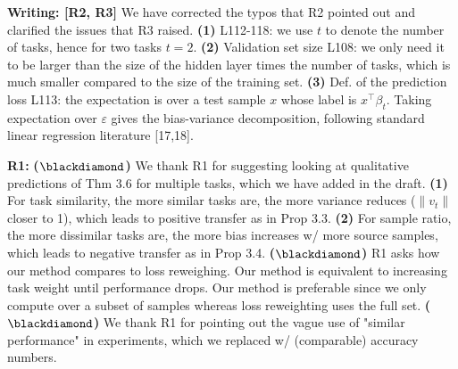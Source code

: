 \documentclass{article}
\begin{document}
\vspace{-0.025in}
\textbf{Writing: [R2, R3]}
We have corrected the typos that R2 pointed out and clarified the issues that R3 raised.
\textbf{(1)} L112-118: we use $t$ to denote the number of tasks, hence for two tasks $t = 2$.
\textbf{(2)} Validation set size L108: we only need it to be larger than the size of the hidden layer times the number of tasks, which is much smaller compared to the size of the training set.
\textbf{(3)} Def. of the prediction loss L113: the expectation is over a test sample $x$ whose label is $x^{\top}\beta_t$.
Taking expectation over $\varepsilon$ gives  the bias-variance decomposition, following standard linear regression literature [17,18].

\vspace{-0.025in}
\textbf{R1:}
\textbf{($\blackdiamond$)} We thank R1 for suggesting looking at qualitative predictions of Thm 3.6 for multiple tasks, which we have added in the  draft.
\textbf{(1)} For task similarity, the more similar tasks are, the more variance reduces ($\|{v_t}\|$ closer to 1), which leads to positive transfer as in Prop 3.3.
\textbf{(2)} For sample ratio, the more dissimilar tasks are, the more bias increases w/ more source samples, which leads to negative transfer as in Prop 3.4.
\textbf{($\blackdiamond$)} R1 asks how our method compares to loss reweighing.
Our method is equivalent to increasing task weight until performance drops.
Our method is preferable since we only compute over a subset of samples whereas loss reweighting uses the full set.
\textbf{($\blackdiamond$)} We thank R1 for pointing out the vague use of "similar performance" in experiments, which we replaced w/ (comparable) accuracy numbers. %
\end{document}
